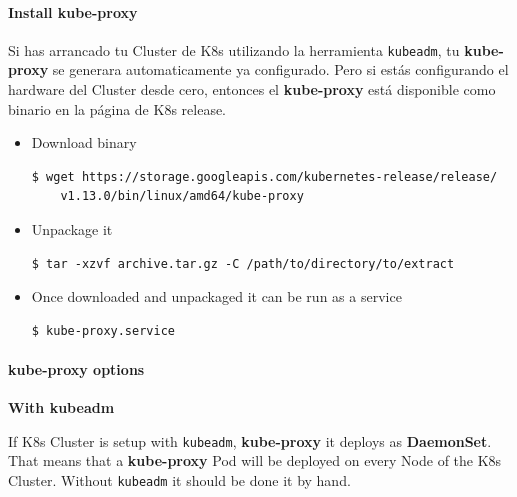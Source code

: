 \documentclass{article}
\newenvironment{blocktemplateI}[1]{%
    \tcolorbox[beamer,%
    noparskip,breakable,
    colframe=Violet,%
    colbacklower=Black,%
    title=#1]}%
    {\endtcolorbox}
\newenvironment{codetemplate}[1][]{%
  \mybasecolorbox[#1]
  \itshape
}{%
  \endmybasecolorbox
}
\begin{document}
\paragraph{Install kube-proxy}

Si has arrancado tu Cluster de K8s utilizando la herramienta \verb|kubeadm|, tu \textbf{kube-proxy} se generara automaticamente ya configurado. Pero si estás configurando el hardware del Cluster desde cero, entonces el \textbf{kube-proxy} está disponible como binario en la página de K8s release.

\begin{itemize}
    \item Download binary
\begin{codetemplate}{}
\begin{verbatim}
$ wget https://storage.googleapis.com/kubernetes-release/release/
    v1.13.0/bin/linux/amd64/kube-proxy
\end{verbatim}
\end{codetemplate}

    \item Unpackage it
\begin{codetemplate}{}
\begin{verbatim}
$ tar -xzvf archive.tar.gz -C /path/to/directory/to/extract
\end{verbatim}
\end{codetemplate} 

    \item Once downloaded and unpackaged it can be run as a service
\begin{codetemplate}{}
\begin{verbatim}
$ kube-proxy.service
\end{verbatim}
\end{codetemplate}
\end{itemize}

\paragraph{kube-proxy options}

\textbf{With kubeadm}

\begin{blocktemplateI} {Note}
If K8s Cluster is setup with \verb|kubeadm|, \textbf{kube-proxy} it deploys as \textbf{DaemonSet}. That means that a \textbf{kube-proxy} Pod will be deployed on every Node of the K8s Cluster. Without \verb|kubeadm| it should be done it by hand.
\end{blocktemplateI}
\end{document}
